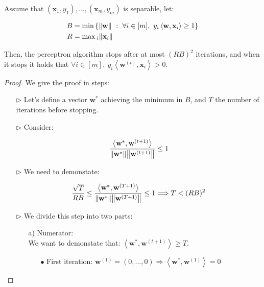 \documentclass[../../main/main.tex]{subfiles}
\begin{document}
\begin{theorem}
    Assume that \( (\mathbf{x}_1,y_1), \dots, (\mathbf{x}_m,y_m) \) is separable,
    let:

    \begin{align*}
        B &= \min{\{ \norm{\mathbf{w}} \ : \ \forall i \in [m], \ y_i \left\langle \mathbf{w}, \mathbf{x}_i \right\rangle \ge 1 \}} \\
        R &= \max{}_i \norm{\mathbf{x}_i}
    \end{align*}

    Then, the perceptron algorithm stops after at most \( (RB)^2 \) iterations, and when it stops it holds that \( \forall i \in [m], \ y_i \left\langle \mathbf{w}^{(t)}, \mathbf{x}_i \right\rangle > 0 \).
\end{theorem}

\begin{proof}
    We give the proof in steps:
    \begin{itemize}
        \item[$\triangleright$] Let's define a vector \( \mathbf{w}^* \) achieving the minimum in \( B \), and \( T \) the number of iterations before stopping.

        \item[$\triangleright$] Consider:

            \begin{equation}
                \frac{\left\langle \mathbf{w}^*, \mathbf{w}^{(t+1)} \right\rangle}{\norm{\mathbf{w}^*} \norm{\mathbf{w}^{(t+1)}}} \le 1
                \label{eq:C5_T1P}
            \end{equation}

        \item[$\triangleright$] We need to demonstate:

            \begin{equation}
                \frac{\sqrt{T}}{RB}
                \le
                \frac{\left\langle \mathbf{w}^*, \mathbf{w}^{(T+1)} \right\rangle}{\norm{\mathbf{w}^*} \norm{\mathbf{w}^{(T+1)}}}
                \le
                1
                \Longrightarrow
                T < (RB)^2
                \label{eq:C5_T1P_2}
            \end{equation}

        \item[$\triangleright$] We divide this step into two parts:
            \begin{itemize}
                \item[a)] Numerator:\\
                    We want to demonstate that: \( \left\langle \mathbf{w}^*, \mathbf{w}^{(t+1)} \right\rangle \ge T \).
                    \begin{itemize}
                        \item[$\bullet$] First iteration: \( \mathbf{w}^{(1)} = (0,\dots,0) \Longrightarrow  \left\langle \mathbf{w}^*, \mathbf{w}^{(1)} \right\rangle = 0 \)


\end{itemize}
\end{itemize}
\end{itemize}
\end{proof}
\end{document}
